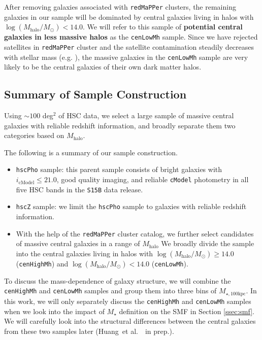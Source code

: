 \documentclass[a4paper,fleqn,usenatbib]{mnras}
\def\etal{{\ et al.~}}
\def\redm{\texttt{redMaPPer}}
\def\rbcg{\texttt{cenHighMh}}
\def\nbcg{\texttt{cenLowMh}}
\def\mstar{{$M_{\star}$}}
\def\mhalo{{$M_{\mathrm{halo}}$}}
\def\logmh{{$\log (M_{\mathrm{halo}}/M_{\odot})$}}
\def\mtot{{$M_{\star,100\mathrm{kpc}}$}}
\begin{document}
    After removing galaxies associated with \redm{} clusters, the remaining galaxies 
    in our sample will be dominated by central galaxies living in halos with 
    \logmh{}$< 14.0$. 
    We will refer to this sample of \textbf{potential central galaxies in less 
    massive halos} as the \nbcg{} sample. 
    Since we have rejected satellites in \redm{} cluster and the satellite 
    contamination steadily decreases with stellar mass (e.g. \citealt{Reid2014, 
    Hoshino2015, Saito2016, vanUitert2016}), the massive galaxies in the \nbcg{} 
    sample are very likely to be the central galaxies of their own dark matter halos.

\subsection{Summary of Sample Construction}
    \label{ssec:sample}

    Using ${\sim} 100$ deg$^2$ of HSC data, we select a large sample of massive central 
    galaxies with reliable redshift information, and broadly separate them two 
    categories based on $M_{\mathrm{halo}}$.
    
    The following is a summary of our sample construction.
    
    \begin{itemize}
        \item \texttt{hscPho} sample: this parent sample consists of bright galaxies 
            with $i_{\mathrm{cModel}} \leq 21.0$, good quality imaging, and reliable 
            \texttt{cModel} photometry in all five HSC bands in the \texttt{S15B} 
            data release. 
        \item \texttt{hscZ} sample: we limit the \texttt{hscPho} sample to galaxies 
            with reliable redshift information. 
        \item With the help of the \redm{} cluster catalog, we further select 
            candidates of massive central galaxies in a range of \mhalo{}
            We broadly divide the sample into the central galaxies living in halos
            with \logmh{}$\geq 14.0$ (\rbcg{}) and \logmh{}$<14.0$ (\nbcg{}). 
    \end{itemize}
    
    To discuss the mass-dependence of galaxy structure, we will combine the \rbcg{}
    and \nbcg{} samples and group them into three bins of \mtot{}.  
    In this work, we will only separately discuss the \rbcg{} and \nbcg{} samples 
    when we look into the impact of \mstar{} definition on the SMF in Section 
    \ref{ssec:smf}. 
    We will carefully look into the structural differences between the central galaxies 
    from these two samples later (Huang\etal~in prep.).  
\end{document}
